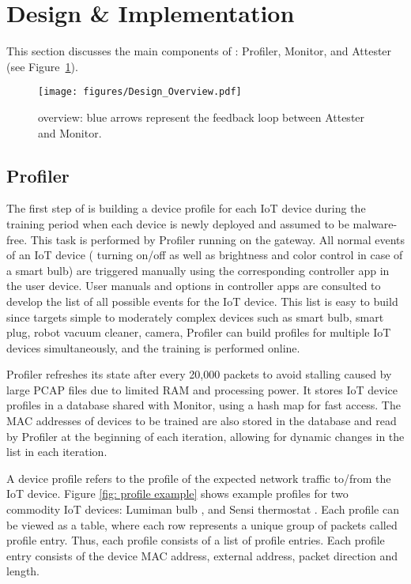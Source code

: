 \section{Design \& Implementation} \label{sec:design}
This section discusses the main components of \system{}: Profiler, Monitor, and Attester (see Figure~\ref{fig: system overview}). 

\begin{figure}
    \centering
    \texttt{[image: figures/Design\_Overview.pdf]}
    \caption{\system overview: blue arrows represent the feedback loop between Attester and Monitor.
    }
    \label{fig: system overview}
\end{figure}

\subsection{Profiler}\label{subsec:profiler}
The first step of \system{} is building a device profile for each IoT device during the training period when each device is newly deployed and assumed to be malware-free. This task is performed by Profiler running on the gateway. All normal events of an IoT device (\eg{} turning on/off as well as brightness and color control in case of a smart bulb) are triggered manually using the corresponding controller app in the user device. User manuals and options in controller apps are consulted to develop the list of all possible events for the IoT device. This list is easy to build since \system{} targets simple to moderately complex devices such as smart bulb, smart plug, robot vacuum cleaner, camera, \etc{} Profiler can build profiles for multiple IoT devices simultaneously, and the training is performed online.

Profiler refreshes its state after every 20,000 packets to avoid stalling caused by large PCAP files due to limited RAM and processing power. It stores IoT device profiles in a database shared with Monitor, using a hash map for fast access. The MAC addresses of devices to be trained are also stored in the database and read by Profiler at the beginning of each iteration, allowing for dynamic changes in the list in each iteration.

A device profile refers to the profile of the expected network traffic to/from the IoT device. Figure \ref{fig: profile example} shows example profiles for two commodity IoT devices: Lumiman bulb \cite{lumimanbulb}, and Sensi thermostat \cite{sensithermostat}. Each profile can be viewed as a table, where each row represents a unique group of packets called profile entry. Thus, each profile consists of a list of profile entries. Each profile entry consists of the device MAC address, external address, packet direction and length. 

